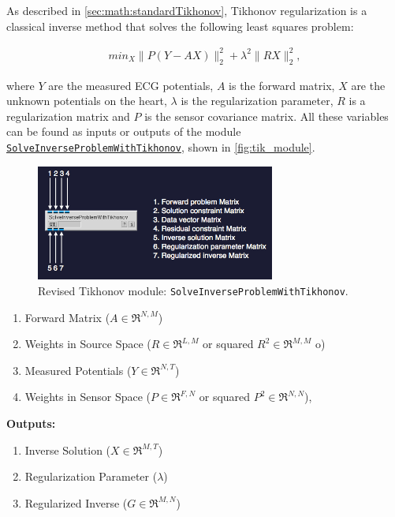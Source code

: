     As described in \autoref{sec:math:standardTikhonov}, Tikhonov regularization is a classical inverse method that solves the following least squares problem:
    \begin{center}
        \begin{eqnarray}
            min_{X} \| P (Y - A X) \|^{2}_{2} + \lambda^{2} \| RX \|^{2}_{2},
        \label{eq:inverseSec_tik_problem}
        \end{eqnarray}
    \end{center}
    where $Y$ are the measured ECG potentials, $A$ is the forward matrix, $X$ are the unknown potentials on the heart, $\lambda$ is the regularization parameter, $R$ is a regularization matrix and $P$ is the sensor covariance matrix. 
    All these variables can be found as inputs or outputs of the module \href{http://scirundocwiki.sci.utah.edu/SCIRunDocs/index.php/CIBC:Documentation:SCIRun:Reference:BioPSE:SolveInverseProblemWithTikhonov}{{\tt SolveInverseProblemWithTikhonov}}, shown in \autoref{fig:tik_module}.
    \begin{figure}
        \begin{center}
        \includegraphics[width=0.7\textwidth]{ECGToolkitGuide_figures/tik1.png}
        \caption{Revised Tikhonov module: {\tt SolveInverseProblemWithTikhonov}.  }
        \label{fig:tik_module}
        \end{center}
    \end{figure}
    \begin{enumerate}
        \item Forward Matrix ($A\in\Re^{N,M}$)
        \item Weights in Source Space ($R\in\Re^{L,M}$ or squared $R^2\in\Re^{M,M}$ o)
        \item Measured Potentials ($Y\in\Re^{N,T}$)
        \item Weights in Sensor Space ($P\in\Re^{F,N}$ or squared $P^2\in\Re^{N,N}$),
    \end{enumerate}
    {\bf Outputs:}
     \begin{enumerate}
        \item Inverse Solution ($X\in\Re^{M,T}$)
        \item Regularization Parameter ($\lambda$)
        \item Regularized Inverse ($G\in\Re^{M,N}$)
    \end{enumerate}

